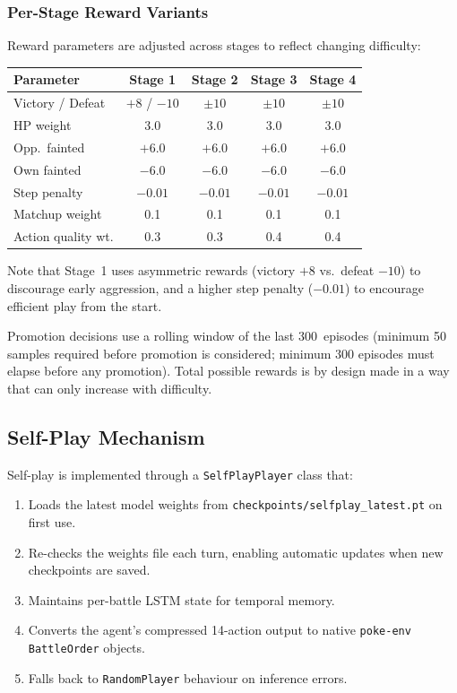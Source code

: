 \subsubsection{Per-Stage Reward Variants}

Reward parameters are adjusted across stages to reflect changing difficulty:

\begin{center}
\small
\begin{tabularx}{\textwidth}{l c c c c}
  \toprule
  \textbf{Parameter} & \textbf{Stage 1} & \textbf{Stage 2} & \textbf{Stage 3} & \textbf{Stage 4} \\
  \midrule
  Victory / Defeat   & $+8$ / $-10$ & $\pm 10$ & $\pm 10$ & $\pm 10$ \\
  HP weight          & 3.0   & 3.0   & 3.0   & 3.0   \\
  Opp.\ fainted      & $+6.0$ & $+6.0$ & $+6.0$ & $+6.0$ \\
  Own fainted        & $-6.0$ & $-6.0$ & $-6.0$ & $-6.0$ \\
  Step penalty       & $-0.01$ & $-0.01$ & $-0.01$ & $-0.01$ \\
  Matchup weight     & 0.1   & 0.1   & 0.1   & 0.1   \\
  Action quality wt. & 0.3   & 0.3   & 0.4   & 0.4   \\
  \bottomrule
\end{tabularx}
\end{center}

Note that Stage~1 uses asymmetric rewards (victory $+8$ vs.\ defeat $-10$) to
discourage early aggression, and a higher step penalty ($-0.01$) to encourage
efficient play from the start.

Promotion decisions use a rolling window of the last 300~episodes (minimum 50
samples required before promotion is considered; minimum 300 episodes must
elapse before any promotion). Total possible rewards is by design made in a way that can only increase with difficulty.

\subsection{Self-Play Mechanism}
\label{sec:self_play}

Self-play is implemented through a \texttt{SelfPlayPlayer} class that:

\begin{enumerate}
  \item Loads the latest model weights from
        \texttt{checkpoints/selfplay\_latest.pt} on first use.
  \item Re-checks the weights file each turn, enabling automatic updates
        when new checkpoints are saved.
  \item Maintains per-battle LSTM state for temporal memory.
  \item Converts the agent's compressed 14-action output to native
        \texttt{poke-env} \texttt{BattleOrder} objects.
  \item Falls back to \texttt{RandomPlayer} behaviour on inference errors.
\end{enumerate}

